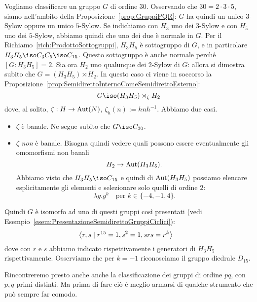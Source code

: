 \begin{esem}
Vogliamo classificare un gruppo $G$ di ordine $30$.\newline
Osservando che $30 = 2 \cdot 3 \cdot 5$, siamo nell'ambito della Proposizione~\ref{prop:GruppiPQR}: $G$ ha quindi un unico $3$-Sylow oppure un unico $5$-Sylow. Se indichiamo con $H_3$ uno dei $3$-Sylow e con $H_5$ uno dei $5$-Sylow, abbiamo quindi che uno dei due è normale in $G$. Per il Richiamo~\ref{rich:ProdottoSottogruppi}, $H_3 H_5$ è sottogruppo di $G$, e in particolare $H_3H_5 \iso C_3 C_5 \iso C_{15}$. Questo sottogruppo è anche normale perché $\left[G : H_3H_5\right] = 2$. Sia ora $H_2$ uno qualunque dei $2$-Sylow di $G$: allora si dimostra subito che $G = (H_3H_5) \rtimes H_2$. In questo caso ci viene in soccorso la Proposizione~\ref{prop:SemidirettoInternoComeSemidirettoEsterno}:
\[G \iso (H_3H_5) \rtimes_\zeta H_2\]
dove, al solito, $\zeta : H \to \mathrm{Aut}(N)$, $\zeta_h (n) := hnh^{-1}$. Abbiamo due casi.
\begin{itemize}
\item $\zeta$ è banale. Ne segue subito che $G \iso C_{30}$.
\item $\zeta$ {\em non} è banale. Bisogna quindi vedere quali possono essere eventualmente gli omomorfismi non banali
\[H_2 \to \mathrm{Aut}(H_3H_5) .\]
Abbiamo visto che $H_3H_5 \iso C_{15}$ e quindi di $\mathrm{Aut}(H_3H_5)$ possiamo elencare esplicitamente gli elementi e selezionare solo quelli di ordine $2$:
\[\lambda g. g^k \quad\text{per } k \in \{-4, -1, 4\} .\]
\end{itemize}
Quindi $G$ è isomorfo ad uno di questi gruppi così presentati (vedi Esempio~\ref{esem:PresentazioneSemidirettoGruppiCiclici}):
\begin{align*}
& \left\langle r, s \mid r^{15} =1,  s^2 = 1, srs = r^k\right\rangle
\end{align*}
dove con $r$ e $s$ abbiamo indicato rispettivamente i generatori di $H_3H_5$ rispettivamente. Osserviamo che per $k = -1$ riconosciamo il gruppo diedrale $D_{15}$. 
\end{esem}

Rincontreremo presto anche anche la classificazione dei gruppi di ordine $pq$, con $p, q$ primi distinti. Ma prima di fare ciò è meglio armarsi di qualche strumento che può sempre far comodo.

